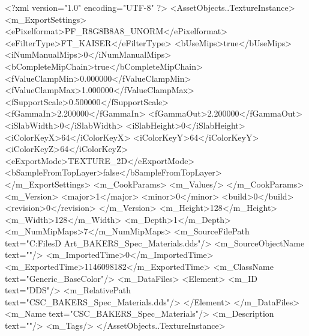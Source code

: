 <?xml version="1.0" encoding="UTF-8" ?>
<AssetObjects..TextureInstance>
	<m_ExportSettings>
		<ePixelformat>PF_R8G8B8A8_UNORM</ePixelformat>
		<eFilterType>FT_KAISER</eFilterType>
		<bUseMips>true</bUseMips>
		<iNumManualMips>0</iNumManualMips>
		<bCompleteMipChain>true</bCompleteMipChain>
		<fValueClampMin>0.000000</fValueClampMin>
		<fValueClampMax>1.000000</fValueClampMax>
		<fSupportScale>0.500000</fSupportScale>
		<fGammaIn>2.200000</fGammaIn>
		<fGammaOut>2.200000</fGammaOut>
		<iSlabWidth>0</iSlabWidth>
		<iSlabHeight>0</iSlabHeight>
		<iColorKeyX>64</iColorKeyX>
		<iColorKeyY>64</iColorKeyY>
		<iColorKeyZ>64</iColorKeyZ>
		<eExportMode>TEXTURE_2D</eExportMode>
		<bSampleFromTopLayer>false</bSampleFromTopLayer>
	</m_ExportSettings>
	<m_CookParams>
		<m_Values/>
	</m_CookParams>
	<m_Version>
		<major>1</major>
		<minor>0</minor>
		<build>0</build>
		<revision>0</revision>
	</m_Version>
	<m_Height>128</m_Height>
	<m_Width>128</m_Width>
	<m_Depth>1</m_Depth>
	<m_NumMipMaps>7</m_NumMipMaps>
	<m_SourceFilePath text="C:\Users\Shadow\Desktop\Working Files\2D Art\Adjacencies\CSC_BAKERS_Spec_Materials.dds"/>
	<m_SourceObjectName text=""/>
	<m_ImportedTime>0</m_ImportedTime>
	<m_ExportedTime>1146098182</m_ExportedTime>
	<m_ClassName text="Generic_BaseColor"/>
	<m_DataFiles>
		<Element>
			<m_ID text="DDS"/>
			<m_RelativePath text="CSC_BAKERS_Spec_Materials.dds"/>
		</Element>
	</m_DataFiles>
	<m_Name text="CSC_BAKERS_Spec_Materials"/>
	<m_Description text=""/>
	<m_Tags/>
</AssetObjects..TextureInstance>

